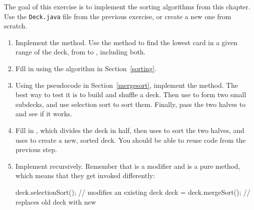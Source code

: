 \begin{exercise}  %

The goal of this exercise is to implement the sorting algorithms from this chapter.
Use the {\tt Deck.java} file from the previous exercise, or create a new one from scratch.


\begin{enumerate}

\item Implement the  method.
Use the  method to find the lowest card in a given range of the deck, from  to , including both.

\item Fill in  using the algorithm in Section~\ref{sorting}.

\item Using the pseudocode in Section~\ref{mergesort}, implement the  method.
The best way to test it is to build and shuffle a deck.
Then use  to form two small subdecks, and use selection sort to sort them.
Finally, pass the two halves to  and see if it works.

\item Fill in , which divides the deck in half, then uses  to sort the two halves, and uses  to create a new, sorted deck.
You should be able to reuse code from the previous step.

\item Implement  recursively.
Remember that  is a modifier and  is a pure method, which means that they get invoked differently:

\begin{code}
deck.selectionSort();      // modifies an existing deck
deck = deck.mergeSort();   // replaces old deck with new
\end{code}

\end{enumerate}

\end{exercise}


